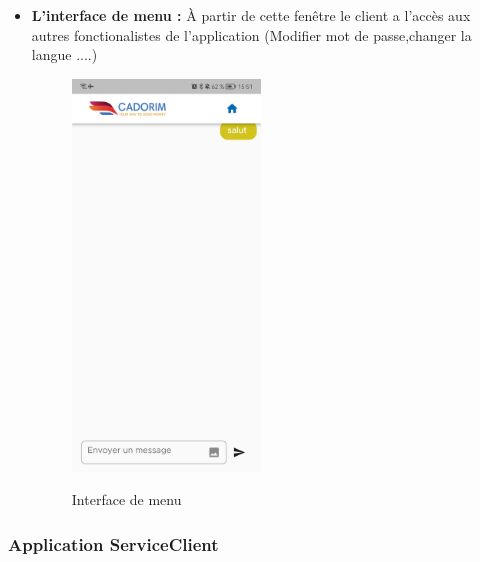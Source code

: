 \begin{itemize}[label=$\ast$]
\newpage
\item \textbf{L’interface de menu
	:} À partir de cette fenêtre le client a l'accès aux autres fonctionalistes de l'application (Modifier mot de passe,changer la langue ....)
\begin{figure}%
	\centering
	{{\includegraphics[width=5cm]{./Template LaTeX/Images/21.jpg} }}%
	\caption{Interface de menu}%
	\label{fig:example}%
\end{figure}
\end{itemize}

\newpage
\subsubsection{Application ServiceClient}



